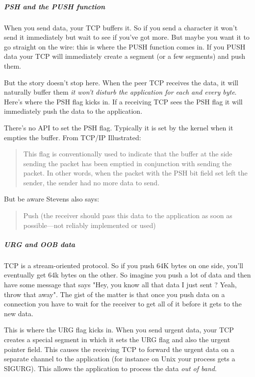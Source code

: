 \subparagraph{PSH and the PUSH function}

When you send data, your TCP buffers it. So if you send a character it won't send it immediately but wait to see if you've got more. But maybe you want it to go straight on the wire: this is where the PUSH function comes in. If you PUSH data your TCP will immediately create a segment (or a few segments) and push them.

But the story doesn't stop here. When the peer TCP receives the data, it will naturally buffer them \emph{it won't disturb the application for each and every byte}. Here's where the PSH flag kicks in. If a receiving TCP sees the PSH flag it will immediately push the data to the application.

There's no API to set the PSH flag. Typically it is set by the kernel when it empties the buffer. From TCP/IP Illustrated:

\begin{quote}
  This flag is conventionally used to indicate that the buffer at the side sending the
  packet has been emptied in conjunction with sending the packet. In other words, when the
  packet with the PSH bit field set left the sender, the sender had no more data to send.
\end{quote}

But be aware Stevens also says:

\begin{quote}
  Push (the receiver should pass this data to the application as soon as possible—not
  reliably implemented or used)
\end{quote}

\subparagraph{URG and OOB data}

TCP is a stream-oriented protocol. So if you push 64K bytes on one side, you'll eventually get 64k bytes on the other. So imagine you push a lot of data and then have some message that says "Hey, you know all that data I just sent ? Yeah, throw that away". The gist of the matter is that once you push data on a connection you have to wait for the receiver to get all of it before it gets to the new data.

This is where the URG flag kicks in. When you send urgent data, your TCP creates a special
segment in which it sets the URG flag and also the urgent pointer field. This causes the
receiving TCP to forward the urgent data on a separate channel to the application (for
instance on Unix your process gets a SIGURG). This allows the application to process the
data \emph{out of band}.

